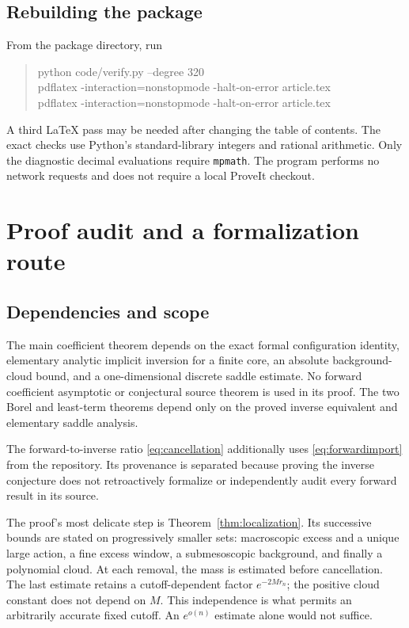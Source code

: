 \documentclass[11pt,a4paper]{article}
\numberwithin{equation}{section}
\theoremstyle{definition}\newtheorem{definition}[theorem]{Definition}
\theoremstyle{remark}\newtheorem{remark}[theorem]{Remark}
\theoremstyle{definition}
\begin{document}
\subsection{Rebuilding the package}
From the package directory, run
\begin{quote}\ttfamily
python code/verify.py --degree 320\\
pdflatex -interaction=nonstopmode -halt-on-error article.tex\\
pdflatex -interaction=nonstopmode -halt-on-error article.tex
\end{quote}
A third LaTeX pass may be needed after changing the table of contents.
The exact checks use Python's standard-library integers and rational
arithmetic. Only the diagnostic decimal evaluations require
\texttt{mpmath}. The program performs no network requests and does not
require a local ProveIt checkout.

\section{Proof audit and a formalization route}
\label{sec:audit}

\subsection{Dependencies and scope}
The main coefficient theorem depends on the exact formal configuration
identity, elementary analytic implicit inversion for a finite core, an
absolute background-cloud bound, and a one-dimensional discrete saddle
estimate. No forward coefficient asymptotic or conjectural source theorem
is used in its proof. The two Borel and least-term theorems depend only on
the proved inverse equivalent and elementary saddle analysis.

The forward-to-inverse ratio \eqref{eq:cancellation} additionally uses
\eqref{eq:forwardimport} from the repository. Its provenance is separated
because proving the inverse conjecture does not retroactively formalize or
independently audit every forward result in its source.

The proof's most delicate step is Theorem~\ref{thm:localization}. Its
successive bounds are stated on progressively smaller sets: macroscopic
excess and a unique large action, a fine excess window, a submesoscopic
background, and finally a polynomial cloud. At each removal, the mass is
estimated before cancellation. The last estimate retains a cutoff-dependent
factor \(e^{-2Mr_n}\); the positive cloud constant does not depend on
\(M\). This independence is what permits an arbitrarily accurate fixed
cutoff. An \(e^{o(n)}\) estimate alone would not suffice.
\end{document}
